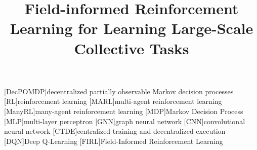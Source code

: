 \documentclass[conference]{IEEEtran}
\begin{document}
%
\title{Field-informed Reinforcement Learning for Learning Large-Scale Collective Tasks} %
%

\author{

\and
{}
\and
{}
}
%
\maketitle              %
%

\newcommand{\meta}[3]{\textcolor{#1}{\textbf{#2}: #3}}
\newcommand{\ga}[1]{\meta{red}{GA}{#1}}
\newcommand{\lukas}[1]{\meta{purple}{Lukas}{#1}}
\newcommand{\mv}[1]{\meta{green}{MV}{#1}}
[DecPOMDP]{decentralized partially observable Markov decision processes}
[RL]{reinforcement learning}
[MARL]{multi-agent reinforcement learning}
[ManyRL]{many-agent reinforcement learning}
[MDP]{Markov Decision Process}
[MLP]{multi-layer perceptron}
[GNN]{graph neural network}
[CNN]{convolutional neural network}
[CTDE]{centralized training and decentralized execution}
[DQN]{Deep Q-Learning}
[FIRL]{Field-Informed Reinforcement Learning}
\end{document}
